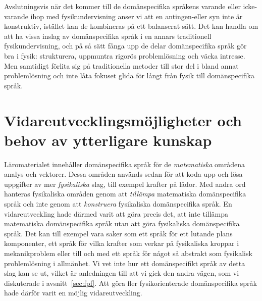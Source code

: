 
Avslutningsvis när det kommer till de domänspecifika språkens varande eller
icke-varande
ihop med fysikundervisning anser vi att en antingen-eller syn inte är konstruktiv,
istället kan de kombineras på ett balanserat sätt. Det kan handla om att ha
vissa inslag av domänspecifika språk i en annars traditionell fysikundervisning,
och på så sätt fånga upp de delar domänspecifika språk gör bra i fysik:
strukturera, uppmuntra rigorös problemlösning och väcka intresse. Men samtidigt
förlita sig på traditionella metoder till stor del i bland annat problemlösning
och inte låta fokuset glida för långt från fysik till domänspecifika språk.

\section{Vidareutvecklingsmöjligheter och behov av ytterligare kunskap}

Läromaterialet innehåller domänspecifika språk för de \textit{matematiska}
områdena analys och vektorer. Dessa områden används sedan för att koda upp och
lösa uppgifter av mer \textit{fysikaliska} slag, till exempel krafter på lådor. Med andra ord hanteras fysikaliska områden genom att \textit{tillämpa} matematiska domänspecifika språk och inte genom att \textit{konstruera} fysikaliska domänspecifika språk. En vidareutveckling
hade därmed varit att göra precis det, att inte tillämpa matematiska
domänspecifika språk utan att göra fysikaliska domänspecifika språk. Det kan till exempel vara
saker som ett språk för ett lutande plans komponenter, ett språk för vilka krafter som verkar på fysikaliska kroppar i mekanikproblem eller till och med ett språk för något så abstrakt som
fysikalisk problemlösning i allmänhet. Vi vet inte hur ett domänspecifikt språk
av detta slag kan se ut, vilket är anledningen till att vi gick den andra vägen,
som vi diskuterade i avsnitt~\ref{sec:fpf}. Att göra fler fysikorienterade
domänspecifika språk hade därför varit en möjlig vidareutveckling.

